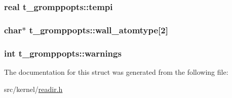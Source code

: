 \hypertarget{structt__gromppopts_ace58a5841ac7594b7f17acb601af503f}{
\subsubsection[{tempi}]{\setlength{\rightskip}{0pt plus 5cm}real {\bf t\-\_\-gromppopts\-::tempi}}}\label{structt__gromppopts_ace58a5841ac7594b7f17acb601af503f}
\hypertarget{structt__gromppopts_a23739cc8aa56ec9a2a6fa8a35113db9c}{
\subsubsection[{wall\-\_\-atomtype}]{\setlength{\rightskip}{0pt plus 5cm}char$\ast$ {\bf t\-\_\-gromppopts\-::wall\-\_\-atomtype}\mbox{[}2\mbox{]}}}\label{structt__gromppopts_a23739cc8aa56ec9a2a6fa8a35113db9c}
\hypertarget{structt__gromppopts_a54b3383660449ab9f95cbefc0e38d99c}{
\subsubsection[{warnings}]{\setlength{\rightskip}{0pt plus 5cm}int {\bf t\-\_\-gromppopts\-::warnings}}}\label{structt__gromppopts_a54b3383660449ab9f95cbefc0e38d99c}


\-The documentation for this struct was generated from the following file\-:\begin{DoxyCompactItemize}
\item 
src/kernel/\hyperlink{readir_8h}{readir.\-h}\end{DoxyCompactItemize}
